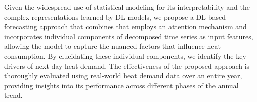 Given the widespread use of statistical modeling for its interpretability and the complex representations learned by DL models, we propose a DL-based forecasting approach that combines that employs an attention mechanism and incorporates individual components of decomposed time series as input features, allowing the model to capture the nuanced factors that influence heat consumption. By elucidating these individual components, we identify the key drivers of next-day heat demand. The effectiveness of the proposed approach is thoroughly evaluated using real-world heat demand data over an entire year, providing insights into its performance across different phases of the annual trend.

